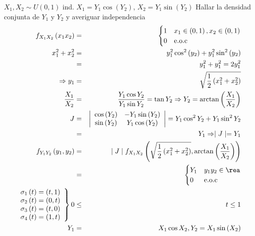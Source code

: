 \begin{Ejem}$X_{1}, X_{2} \sim U \left(0,1 \right)$ ind. $X_{1}= Y_{1} \cos \left(Y_{2} \right)$, $X_{2} = Y_{1} \sin \left(Y_{2} \right)$ Hallar la densidad conjunta de $Y_{1} $ y $Y_{2}$ y averiguar independencia
\begin{eqnarray*}
f_{X_{1}X_{2}} \left(x_{1} x_{2} \right) &=&  
\begin{cases}
1 & x_{1} \in  \left(0,1 \right), x_{2} \in \left(0,1 \right)\\
0 & \textrm{e.o.c}
\end{cases}\\
x_{1}^2+ x_{2}^2 &=& y_{1}^2 \cos^2 \left(y_{2} \right) + y_{1}^2 \sin ^2 \left(y_{2} \right)\\
&=& y_{1}^2 + y_{1}^2 = 2 y_{1}^2\\
\Rightarrow y_{1} &=& \sqrt{\frac{1}{2} \left( x_{1}^2 + x_{2}^2 \right) }\\
\frac{X_{1}}{X_{2}} &=& \frac{Y_{1} \cos Y_{2}}{Y_{1} \sin Y_{2}} = \tan Y_{2} \Rightarrow Y_{2}= \arctan \left( \frac{X_{1}}{X_{2}} \right)\\
J &=& \left| \begin{array}{cc}
\cos \left( Y_{2} \right) & -Y_{1} \sin \left( Y_{2} \right) \\
\sin \left( Y_{2} \right) & Y_{1} \cos \left( Y_{2} \right)
\end{array} \right| = Y_{1} \cos^2 Y_{2} + Y_{1} \sin^2 Y_{2}\\
&=& Y_{1} \Rightarrow \mid J \mid = Y_{1}\\
f_{Y_{1}Y_{2}} \left( y_{1}, y_{2} \right) &=& \mid J \mid f_{X_{1}X_{2}} \left( \sqrt{ \frac{1}{2} \left(x_{1}^2 + x_{2}^2 \right)}, \arctan  \left( \frac{X_{1}}{X_{2}} \right) \right)\\
&=& \begin{cases}
Y_{1} & y_{1}y_{2}\in \rea\\
0 & \textrm{e.o.c}
\end{cases}\\
\left.
\begin{array}{cccc}
\sigma_{1} \left( t \right) = \left(t,1 \right)\\
\sigma_{2} \left( t \right) = \left(0,t \right)\\
\sigma_{3} \left( t \right) = \left(t,0 \right)\\
\sigma_{4} \left( t \right) = \left(1,t \right)
\end{array}
\right\} 0 &\leq& t \leq 1\\
Y_{1} &=& X_{1} \cos X_{2}, Y_{2} = X_{1} \sin \left( X_{2} \right)\\

\end{eqnarray*}
\end{Ejem}
